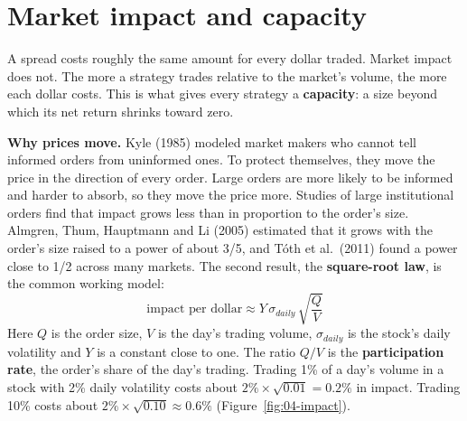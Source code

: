 \section{Market impact and capacity}
\label{sec:04-capacity}

A spread costs roughly the same amount for every dollar traded. Market impact does not. The more a strategy trades relative to the market's volume, the more each dollar costs. This is what gives every strategy a \textbf{capacity}: a size beyond which its net return shrinks toward zero.

\textbf{Why prices move.} Kyle (1985) modeled market makers who cannot tell informed orders from uninformed ones. To protect themselves, they move the price in the direction of every order. Large orders are more likely to be informed and harder to absorb, so they move the price more. Studies of large institutional orders find that impact grows less than in proportion to the order's size. Almgren, Thum, Hauptmann and Li (2005) estimated that it grows with the order's size raised to a power of about 3/5, and T\'oth et al.\ (2011) found a power close to 1/2 across many markets. The second result, the \textbf{square-root law}, is the common working model:
\begin{equation}
  \text{impact per dollar} \approx Y\,\sigma_{daily}\,\sqrt{\frac{Q}{V}}
  \label{eq:04-impact}
\end{equation}
Here $Q$ is the order size, $V$ is the day's trading volume, $\sigma_{daily}$ is the stock's daily volatility and $Y$ is a constant close to one. The ratio $Q/V$ is the \textbf{participation rate}, the order's share of the day's trading. Trading 1\% of a day's volume in a stock with 2\% daily volatility costs about $2\% \times \sqrt{0.01} = 0.2\%$ in impact. Trading 10\% costs about $2\% \times \sqrt{0.10} \approx 0.6\%$ (Figure~\ref{fig:04-impact}).

